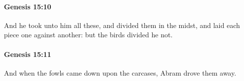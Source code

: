 		\paragraph{Genesis 15:10} %
			\label{GENESIS-15-10}

			And he took unto him all these, and divided them in the midst, and laid each piece one against another: but the birds divided he not.


		\paragraph{Genesis 15:11} %
			\label{GENESIS-15-11}

			And when the fowls came down upon the carcases, Abram drove them away.


